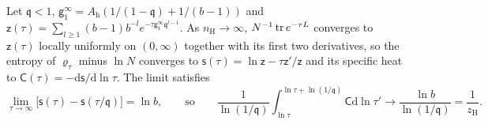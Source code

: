 \begin{proposition}\label{prop:obj-specific-heat}
Let $\mathfrak q<1$, $\mathsf g_1^\infty=A_{\mathrm h}(1/(1-\mathfrak q)+1/(b-1))$ and $\mathsf z(\tau)=\sum_{l\ge1}(b-1)b^{-l}e^{-\tau\mathsf g_1^\infty\mathfrak q^{l-1}}$. As $n_{\mathrm H}\to\infty$, $N^{-1}\operatorname{tr} e^{-\tau L}$ converges to $\mathsf z(\tau)$ locally uniformly on $(0,\infty)$ together with its first two derivatives, so the entropy of $\varrho_\tau$ minus $\ln N$ converges to $\mathsf s(\tau)=\ln\mathsf z-\tau\mathsf z'/\mathsf z$ and its specific heat to $\mathsf C(\tau)=-\mathrm d\mathsf s/\mathrm d\ln\tau$. The limit satisfies
\[
\lim_{\tau\to\infty}\bigl[\mathsf s(\tau)-\mathsf s(\tau/\mathfrak q)\bigr]=\ln b,\qquad\text{so}\qquad\frac1{\ln(1/\mathfrak q)}\int_{\ln\tau}^{\ln\tau+\ln(1/\mathfrak q)}\mathsf C\mathrm d\ln\tau'\longrightarrow\frac{\ln b}{\ln(1/\mathfrak q)}=\frac1{z_{\mathrm H}}.
\]
\end{proposition}

